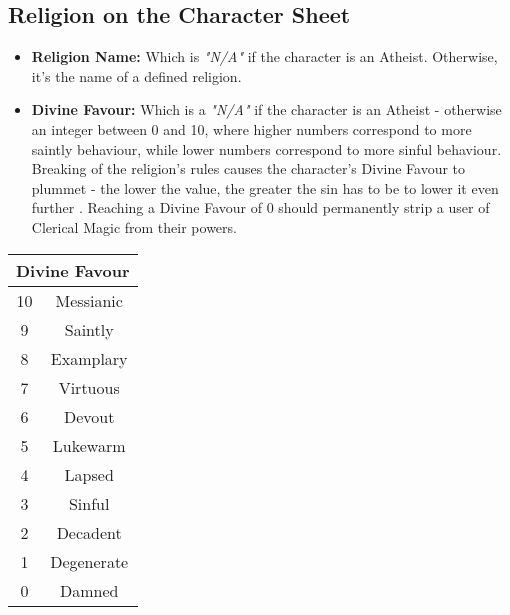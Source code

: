 \subsection{Religion on the Character Sheet}
\begin{itemize}
\item \textbf{Religion Name:} Which is \textit{"N/A"} if the character is an Atheist. Otherwise, it's the name of a defined religion.
\item \textbf{Divine Favour:} Which is a \textit{"N/A"} if the character is an Atheist - otherwise an integer between 0 and 10, where higher numbers correspond to more saintly behaviour, while lower numbers correspond to more sinful behaviour. Breaking of the religion's rules causes the character's Divine Favour to plummet - the lower the value, the greater the sin has to be to lower it even further . Reaching a Divine Favour of 0 should permanently strip a user of Clerical Magic from their powers.
\end{itemize}
\begin{tabular}{|c|c|}
\hline
\multicolumn{2}{|c|}{\textbf{Divine Favour}} \\ \hline
10 & Messianic \\ \hline
9 & Saintly \\ \hline
8 & Examplary \\ \hline
7 & Virtuous \\ \hline
6 & Devout \\ \hline
5 & Lukewarm \\ \hline
4 & Lapsed \\ \hline
3 & Sinful \\ \hline
2 & Decadent \\ \hline
1 & Degenerate \\ \hline
0 & Damned \\ \hline
\end{tabular}
